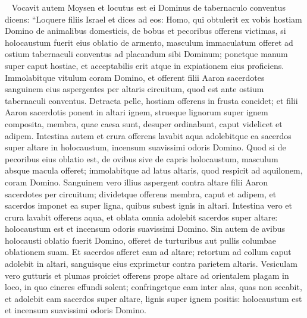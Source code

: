 
\begin{biblechapter}   
\verse Vocavit autem Moysen et locutus est ei Dominus de tabernaculo conventus dicens: 
\verse “Loquere filiis Israel et dices ad eos: Homo, qui obtulerit ex vobis hostiam Domino de animalibus domesticis, de bobus et pecoribus offerens victimas, 
\verse si holocaustum fuerit eius oblatio de armento, masculum immaculatum offeret ad ostium tabernaculi conventus ad placandum sibi Dominum; 
\verse ponetque manum super caput hostiae, et acceptabilis erit atque in expiationem eius proficiens. 
\verse Immolabitque vitulum coram Domino, et offerent filii Aaron sacerdotes sanguinem eius aspergentes per altaris circuitum, quod est ante ostium tabernaculi conventus.  
\verse Detracta pelle, hostiam offerens in frusta concidet; 
\verse et filii Aaron sacerdotis ponent in altari ignem, strueque lignorum super ignem composita,  
\verse membra, quae caesa sunt, desuper ordinabunt, caput videlicet et adipem. 
\verse Intestina autem et crura offerens lavabit aqua adolebitque ea sacerdos super altare in holocaustum, incensum suavissimi odoris Domino. 
\verse Quod si de pecoribus eius oblatio est, de ovibus sive de capris holocaustum, masculum absque macula offeret; 
\verse immolabitque ad latus altaris, quod respicit ad aquilonem, coram Domino. Sanguinem vero illius aspergent contra altare filii Aaron sacerdotes per circuitum; 
\verse dividetque offerens membra, caput et adipem, et sacerdos imponet ea super ligna, quibus subest ignis in altari. 
\verse Intestina vero et crura lavabit offerens aqua, et oblata omnia adolebit sacerdos super altare: holocaustum est et incensum odoris suavissimi Domino. 
\verse Sin autem de avibus holocausti oblatio fuerit Domino, offeret de turturibus aut pullis columbae oblationem suam. 
\verse Et sacerdos afferet eam ad altare; retortum ad collum caput adolebit in altari, sanguisque eius exprimetur contra parietem altaris. 
\verse Vesiculam vero gutturis et plumas proiciet offerens prope altare ad orientalem plagam in loco, in quo cineres effundi solent; 
\verse confringetque eam inter alas, quas non secabit, et adolebit eam sacerdos super altare, lignis super ignem positis: holocaustum est et incensum suavissimi odoris Domino. 
\end{biblechapter}

